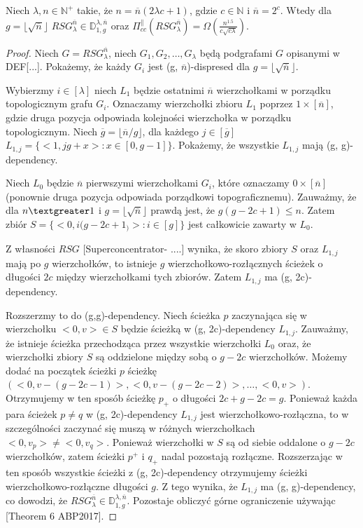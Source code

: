 \begin{theorem}
	Niech $ \lambda, n \in \mathbb{N}^{+}$ takie, że $n = \overline{n}(2 \lambda c + 1) $, gdzie $c \in \mathbb{N}$ i $ \overline{n} = 2^{c}$.
	Wtedy dla $ g = \lfloor \sqrt{ \overline{n}} \rfloor$
	$ RSG_{\lambda}^{ \overline{n}} \in \mathbb{D}_{1,g}^{\lambda, \overline{n}} $
	oraz
	$ \Pi_{cc}^{ \parallel }(RSG_{\lambda}^{\overline{n}}) = \Omega \left( \frac{n^{1.5}}{c \sqrt{c \lambda}} \right) $.
\end{theorem}

\begin{proof}
	Niech $G = RSG_{\lambda}^{ \overline{n}}$, niech $G_{1}, G_{2}, \dots , G_{ \lambda }$ będą
	podgrafami $G$ opisanymi w DEF[...].
	Pokażemy, że każdy $G_{i}$ jest (g, $\overline{n}$)-dispresed dla $g = \lfloor \sqrt{ \overline{n}} \rfloor $.
	
	Wybierzmy $i \in [ \lambda ]$ niech $L_{1}$ będzie ostatnimi $\overline{n}$ wierzchołkami w porządku topologicznym grafu $G_{i}$.
	Oznaczamy wierzchołki zbioru $L_{1}$ poprzez ${1} \times [ \overline{n} ]$, gdzie druga pozycja odpowiada kolejności wierzchołka w porządku topologicznym.
	Niech $ \overline{g} = \lfloor \overline{n} / g \rfloor$, dla każdego $j \in [ \overline{g}]$
	$L_{1, j} = \{ <1, jg + x> : x \in [0, g-1] \}$.
	Pokażemy, że wszystkie $L_{1, j}$ mają (g, g)-dependency.
	
	Niech $L_{0}$ będzie $\overline{n}$ pierwszymi wierzchołkami $G_{i}$, które oznaczamy ${0} \times [\overline{n}]$ (ponownie druga pozycja odpowiada porządkowi topograficznemu).
	Zauważmy, że dla $n \textgreater 1$ i $g = \lfloor \sqrt{ \overline{n}} \rfloor$ prawdą jest, że $g(g - 2c + 1) \leq n$.
	Zatem zbiór $S = \{ <0, i(g - 2c + 1_)>: i \in [g] \}$ jest całkowicie zawarty w $L_{0}$.
	
	Z własności $RSG$ [Superconcentrator- ....] wynika, że skoro zbiory $S$ oraz $L_{1,j}$ mają po $g$ wierzchołków, to istnieje $g$ wierzchołkowo-rozłącznych ścieżek o długości $2c$ między wierzchołkami tych zbiorów. Zatem $L_{1,j}$ ma (g, 2c)-dependency.
	
	Rozszerzmy to do (g,g)-dependency.
	Niech ścieżka $p$ zaczynająca się w wierzchołku $<0, v> \in S$ będzie ścieżką w (g, 2c)-dependency $L_{1,j}$. Zauważmy, że istnieje ścieżka przechodząca przez wszystkie wierzchołki $L_{0}$ oraz, że wierzchołki zbiory $S$ są oddzielone między sobą o $g - 2c$ wierzchołków.
	Możemy dodać na początek ścieżki $p$ ścieżkę $( <0, v - (g - 2c - 1)>, <0, v - (g - 2c -2)>, \dots, <0, v>)$.
	Otrzymujemy w ten sposób ścieżkę $p_{+}$ o długości $2c + g - 2c = g$.
	Ponieważ każda para ścieżek $p \neq q$ w (g, 2c)-dependency $L_{1,j}$ jest wierzchołkowo-rozłączna,
	to w szczególności zaczynać się muszą w różnych wierzchołkach $<0, v_{p}> \neq <0, v_{q}>$.
	Ponieważ wierzchołki w $S$ są od siebie oddalone o $g - 2c$ wierzchołków, zatem ścieżki $p^{+}$ i $q_{+}$ nadal pozostają rozłączne.
	Rozszerzając w ten sposób wszystkie ścieżki z (g, 2c)-dependency otrzymujemy ścieżki wierzchołkowo-rozłączne długości $g$. Z tego wynika, że $L_{1,j}$ ma (g, g)-dependency, co dowodzi, że $ RSG_{\lambda}^{ \overline{n}} \in \mathbb{D}_{1,g}^{\lambda, \overline{n}} $.
	Pozostaje obliczyć górne ograniczenie używając [Theorem 6 ABP2017].
	

\end{proof}

